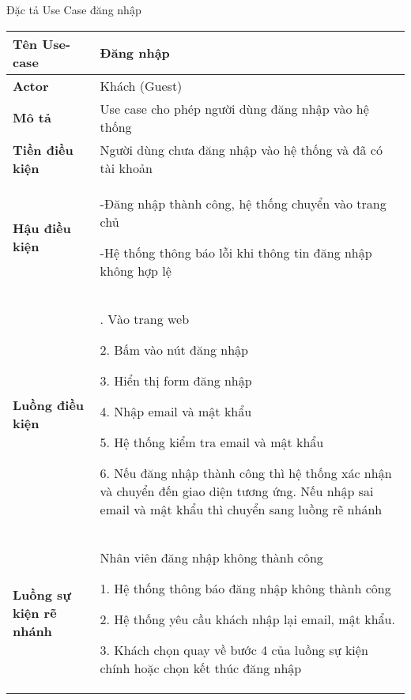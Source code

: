 \documentclass[12pt,a4paper]{report}
\begin{document}
 \newpage
 Đặc tả Use Case đăng nhập
 \begin{center}
 \begin{tabular}{|>{\raggedright\arraybackslash}m{4cm}|>{\raggedright\arraybackslash}m{11.5cm}|}
 \hline 
 \textbf{Tên Use-case} & Đăng nhập \\ 
 \hline 
 \textbf{Actor} & Khách (Guest) \\ 
 \hline 
\textbf{ Mô tả} & Use case cho phép người dùng đăng nhập vào hệ thống \\ 
 \hline 
 \textbf{Tiền điều kiện} & Người dùng chưa đăng nhập vào hệ thống và đã có tài khoản\\ 
 \hline 
 \textbf{Hậu điều kiện} & -Đăng nhập thành công, hệ thống chuyển vào trang chủ
 
 				 -Hệ thống thông báo lỗi khi thông tin đăng nhập không hợp lệ  \\ 
 \hline 
 \textbf{Luồng điều kiện} & 1. Vào trang web
 
				   2. Bấm vào nút đăng nhập

			       3. Hiển thị form đăng nhập

				   4. Nhập email và mật khẩu
				   
				   5. Hệ thống kiểm tra email và mật khẩu

				   6. Nếu đăng nhập thành công thì hệ thống xác nhận và chuyển đến giao diện tương ứng. Nếu nhập sai email và mật khẩu thì chuyển sang luồng rẽ nhánh\\ 
 \hline 
 \textbf{Luồng sự kiện rẽ nhánh} & Nhân viên đăng nhập không thành công
 
						1. Hệ thống thông báo đăng nhập không thành công
						
						2. Hệ thống yêu cầu khách nhập lại email, mật khẩu.
						
						3. Khách chọn quay về bước 4 của luồng sự kiện chính hoặc chọn kết thúc đăng nhập\\ 
 \hline 
 \end{tabular} 
 \end{center}
 
\end{document}
